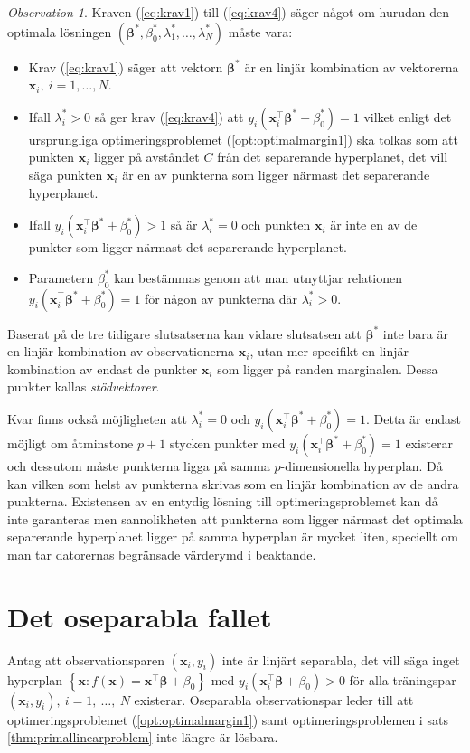 \documentclass[a4paper, 12pt]{report}
\theoremstyle{definition}
\theoremstyle{remark}
\newtheorem*{rem}{Observation}
\newcommand{\bfbeta}{{\boldsymbol{\beta}}}
\begin{document}
\begin{rem}
	Kraven (\ref{eq:krav1}) till (\ref{eq:krav4}) säger något om hurudan den optimala lösningen $\left(\bfbeta^*,\beta^*_0, \lambda_1^*,\dots,\lambda_N^*\right)$ måste vara:
	\begin{itemize}
		\item Krav (\ref{eq:krav1}) säger att vektorn $\bfbeta^*$ är en linjär kombination av vektorerna $\mathbf{x}_i,~i=1,\dots,N$.
		\item Ifall $\lambda^*_i > 0$ så ger krav (\ref{eq:krav4}) att $y_i\left(\mathbf{x}_i^\intercal\bfbeta^*+\beta^*_0\right) = 1$ vilket enligt det ursprungliga optimeringsproblemet (\ref{opt:optimalmargin1}) ska tolkas som att punkten $\mathbf{x}_i$ ligger på avståndet $C$ från det separerande hyperplanet, det vill säga punkten $\mathbf{x}_i$ är en av punkterna som ligger närmast det separerande hyperplanet.
		\item Ifall $y_i\left(\mathbf{x}^\intercal_i\bfbeta^* + \beta^*_0\right) > 1$ så är $\lambda^*_i = 0$ och punkten $\mathbf{x}_i$ är inte en av de punkter som ligger närmast det separerande hyperplanet.
		\item Parametern $\beta^*_0$ kan bestämmas genom att man utnyttjar relationen $y_i\left( \mathbf{x}_i^\intercal \bfbeta^* + \beta^*_0\right) = 1$ för någon av punkterna där $\lambda^*_i > 0$.
	\end{itemize}
	Baserat på de tre tidigare slutsatserna kan vidare slutsatsen att $\bfbeta^*$ inte bara är en linjär kombination av observationerna $\mathbf{x}_i$, utan mer specifikt en linjär kombination av endast de punkter $\mathbf{x}_{i}$ som ligger på randen marginalen. Dessa punkter kallas \emph{stödvektorer}.
\end{rem}

Kvar finns också möjligheten att $\lambda^*_i = 0$ och $y_i\left( \mathbf{x}_i^\intercal \bfbeta^* + \beta^*_0\right) = 1$. Detta är endast möjligt om åtminstone $p+1$ stycken punkter med $y_i\left( \mathbf{x}_i^\intercal \bfbeta^* + \beta^*_0 \right) = 1$ existerar och dessutom måste punkterna ligga på samma $p$-dimensionella hyperplan. Då kan vilken som helst av punkterna skrivas som en linjär kombination av de andra punkterna. Existensen av en entydig lösning till optimeringsproblemet kan då inte garanteras men sannolikheten att punkterna som ligger närmast det optimala separerande hyperplanet ligger på samma hyperplan är mycket liten, speciellt om man tar datorernas begränsade värderymd i beaktande.

\section{Det oseparabla fallet}
Antag att observationsparen $\left(\mathbf{x}_i, y_i\right)$ inte är linjärt separabla, det vill säga inget hyperplan $\left\{\mathbf{x} : f\left(\mathbf{x}\right) = \mathbf{x}^\intercal \bfbeta + \beta_0 \right\}$ med $y_i\left(\mathbf{x}_i^\intercal\bfbeta+\beta_0\right)>0$ för alla träningspar $(\mathbf{x}_i,y_i),~i=1,~\dots,~N$ existerar. Oseparabla observationspar leder till att optimeringsproblemet (\ref{opt:optimalmargin1}) samt optimeringsproblemen i sats \ref{thm:primallinearproblem} inte längre är lösbara.
\end{document}
